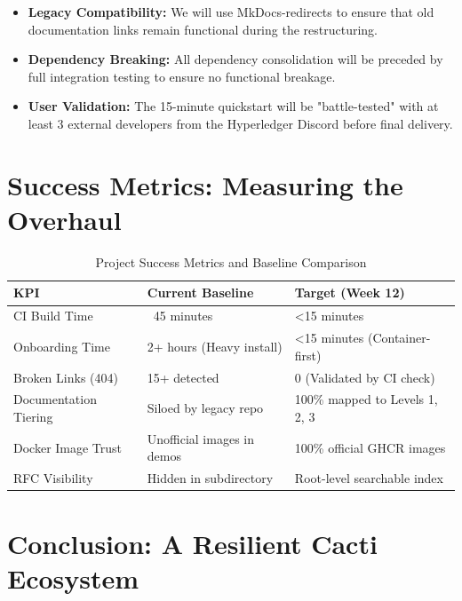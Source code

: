 \begin{tcolorbox}[colback=yellow!5!white, colframe=yellow!60!black,
  title=Project Scope and Constraints,
  fonttitle=\bfseries, arc=4pt]
\begin{itemize}[leftmargin=*]
\item \textbf{Legacy Compatibility:} We will use MkDocs-redirects to ensure that old documentation links remain functional during the restructuring.
\item \textbf{Dependency Breaking:} All dependency consolidation will be preceded by full integration testing to ensure no functional breakage.
\item \textbf{User Validation:} The 15-minute quickstart will be "battle-tested" with at least 3 external developers from the Hyperledger Discord before final delivery.
\end{itemize}
\end{tcolorbox}

\section{Success Metrics: Measuring the Overhaul}

\begin{table}[h]
\centering
\begin{tabularx}{\textwidth}{l X X}
\toprule
\textbf{\color{primary} KPI} & \textbf{\color{primary} Current Baseline} & \textbf{\color{primary} Target (Week 12)} \\
\midrule
CI Build Time & ~45 minutes & <15 minutes \\
Onboarding Time & 2+ hours (Heavy install) & <15 minutes (Container-first) \\
Broken Links (404) & 15+ detected & 0 (Validated by CI check) \\
Documentation Tiering & Siloed by legacy repo & 100\% mapped to Levels 1, 2, 3 \\
Docker Image Trust & Unofficial images in demos & 100\% official GHCR images \\
RFC Visibility & Hidden in subdirectory & Root-level searchable index \\
\bottomrule
\end{tabularx}
\caption{Project Success Metrics and Baseline Comparison}
\label{tab:metrics}
\end{table}

\section{Conclusion: A Resilient Cacti Ecosystem}

